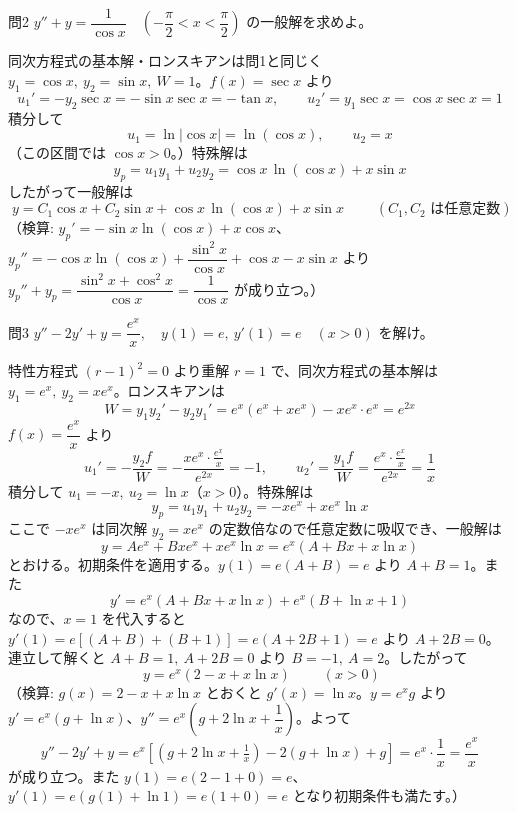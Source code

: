 \documentclass[a4paper,11pt]{article}
\begin{document}
\clearpage
\begin{mondaiboxS}{問2}
$y'' + y = \dfrac{1}{\cos x} \quad \left(-\dfrac{\pi}{2} < x < \dfrac{\pi}{2}\right)$ の一般解を求めよ。
\end{mondaiboxS}
\kaitou
同次方程式の基本解・ロンスキアンは問1と同じく $y_{1}=\cos x,\ y_{2}=\sin x,\ W=1$。$f(x)=\sec x$ より
\[
u_{1}' = -y_{2}\sec x = -\sin x\sec x = -\tan x,
\qquad
u_{2}' = y_{1}\sec x = \cos x\sec x = 1
\]
積分して
\[
u_{1} = \ln|\cos x| = \ln(\cos x), \qquad u_{2} = x
\]
（この区間では $\cos x>0$。）特殊解は
\[
y_{p} = u_{1}y_{1}+u_{2}y_{2} = \cos x\,\ln(\cos x) + x\sin x
\]
したがって一般解は
\[
\boxed{\; y = C_{1}\cos x + C_{2}\sin x + \cos x\,\ln(\cos x) + x\sin x \;}
\qquad (C_{1}, C_{2}\text{ は任意定数})
\]
（検算: $y_{p}'=-\sin x\ln(\cos x)+x\cos x$、$y_{p}''=-\cos x\ln(\cos x)+\dfrac{\sin^{2}x}{\cos x}+\cos x-x\sin x$ より
$y_{p}''+y_{p}=\dfrac{\sin^{2}x+\cos^{2}x}{\cos x}=\dfrac{1}{\cos x}$ が成り立つ。）

\clearpage
\begin{mondaiboxS}{問3}
$y'' - 2y' + y = \dfrac{e^{x}}{x}, \quad y(1)=e,\ y'(1)=e \quad (x>0)$ を解け。
\end{mondaiboxS}
\kaitou
特性方程式 $(r-1)^{2}=0$ より重解 $r=1$ で、同次方程式の基本解は $y_{1}=e^{x},\ y_{2}=xe^{x}$。ロンスキアンは
\[
W = y_{1}y_{2}' - y_{2}y_{1}' = e^{x}(e^{x}+xe^{x}) - xe^{x}\cdot e^{x} = e^{2x}
\]
$f(x)=\dfrac{e^{x}}{x}$ より
\[
u_{1}' = -\frac{y_{2}f}{W} = -\frac{xe^{x}\cdot \frac{e^{x}}{x}}{e^{2x}} = -1,
\qquad
u_{2}' = \frac{y_{1}f}{W} = \frac{e^{x}\cdot\frac{e^{x}}{x}}{e^{2x}} = \frac{1}{x}
\]
積分して $u_{1} = -x,\ u_{2} = \ln x$（$x>0$）。特殊解は
\[
y_{p} = u_{1}y_{1}+u_{2}y_{2} = -xe^{x} + xe^{x}\ln x
\]
ここで $-xe^{x}$ は同次解 $y_{2}=xe^{x}$ の定数倍なので任意定数に吸収でき、一般解は
\[
y = Ae^{x} + Bxe^{x} + xe^{x}\ln x = e^{x}\left(A + Bx + x\ln x\right)
\]
とおける。初期条件を適用する。$y(1) = e(A+B) = e$ より $A+B=1$。また
\[
y' = e^{x}(A+Bx+x\ln x) + e^{x}(B+\ln x + 1)
\]
なので、$x=1$ を代入すると $y'(1)=e\left[(A+B)+(B+1)\right]=e(A+2B+1)=e$ より $A+2B=0$。連立して解くと $A+B=1,\ A+2B=0$ より $B=-1,\ A=2$。したがって
\[
\boxed{\; y = e^{x}\left(2 - x + x\ln x\right) \;} \qquad (x>0)
\]
（検算: $g(x)=2-x+x\ln x$ とおくと $g'(x)=\ln x$。$y=e^{x}g$ より $y'=e^{x}(g+\ln x)$、$y''=e^{x}\left(g+2\ln x+\dfrac{1}{x}\right)$。よって
\[
y''-2y'+y = e^{x}\left[\left(g+2\ln x+\tfrac{1}{x}\right)-2(g+\ln x)+g\right] = e^{x}\cdot\frac{1}{x} = \frac{e^{x}}{x}
\]
が成り立つ。また $y(1)=e(2-1+0)=e$、$y'(1)=e(g(1)+\ln 1)=e(1+0)=e$ となり初期条件も満たす。）
\end{document}
